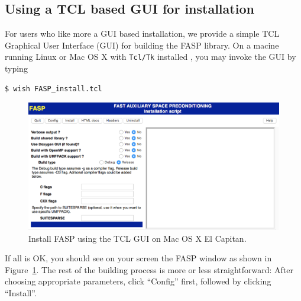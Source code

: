 \documentclass[11pt]{memoir}
\begin{document}
\subsection{Using a TCL based GUI for installation}
For users who like more a GUI based installation, we provide a simple
TCL Graphical User
Interface (GUI) for building the FASP library. On a macine running
Linux or Mac OS X with \verb|Tcl/Tk| installed , you may invoke the GUI
by typing
%
\begin{lstlisting}[numbers=none]
$ wish FASP_install.tcl
\end{lstlisting}
%
\begin{figure}[h!!] %
   \centering
   \includegraphics[width=\linewidth]{fig/install-fasp-gui.png} 
   \caption{Install FASP using the TCL GUI on Mac OS X El Capitan.}
   \label{fig:gui}
\end{figure}
%
If all is OK, you should see on your screen the FASP window as shown
in Figure~\ref{fig:gui}. The rest of the building process is more or
less straightforward: After choosing appropriate parameters, click
``Config'' first, followed by clicking ``Install''.
\end{document}
